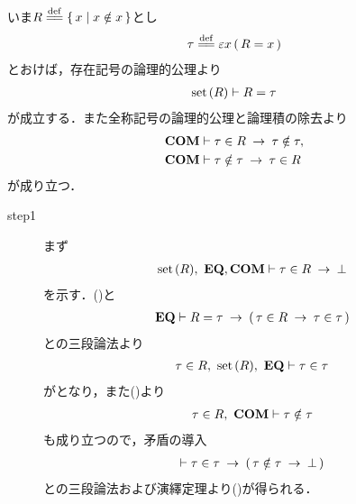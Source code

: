 	\begin{sketch}
		いま$R \defeq \Set{x}{x \notin x}$とし
		\begin{align}
			\tau \defeq \varepsilon x\, (\, R = x\, )
		\end{align}
		とおけば，存在記号の論理的公理より
		\begin{align}
			\operatorname*{set}\hspace{0.15em}(R) \vdash R = \tau
			\label{fom:Russell_paradox_1}
		\end{align}
		が成立する．また全称記号の論理的公理と論理積の除去より
		\begin{align}
			\mbox{\bf COM} &\vdash \tau \in R \hspace{0.25em}\rightarrow\hspace{0.25em} \tau \notin \tau, 
			\label{fom:Russell_paradox_2} \\
			\mbox{\bf COM} &\vdash \tau \notin \tau \hspace{0.25em}\rightarrow\hspace{0.25em} \tau \in R
			\label{fom:Russell_paradox_3}
		\end{align}
		が成り立つ．
		
		\begin{description}
			\item[step1]
				まず
				\begin{align}
					\operatorname*{set}\hspace{0.15em}(R),\ \mbox{{\bf EQ}},\mbox{\bf COM} \vdash \tau \in R \hspace{0.25em}\rightarrow\hspace{0.25em} \bot
					\label{fom:Russell_paradox_4}
				\end{align}
				を示す．()と
				\begin{align}
					\mbox{{\bf EQ}} \vdash R = \tau \hspace{0.25em}\rightarrow\hspace{0.25em} (\, \tau \in R \hspace{0.25em}\rightarrow\hspace{0.25em} \tau \in \tau\, )
				\end{align}
				との三段論法より
				\begin{align}
					\tau \in R,\ \operatorname*{set}\hspace{0.15em}(R),\ \mbox{{\bf EQ}} \vdash \tau \in \tau
				\end{align}
				がとなり，また()より
				\begin{align}
					\tau \in R,\ \mbox{\bf COM} \vdash \tau \notin \tau
				\end{align}
				も成り立つので，矛盾の導入
				\begin{align}
					\vdash \tau \in \tau \hspace{0.25em}\rightarrow\hspace{0.25em} (\, \tau \notin \tau \hspace{0.25em}\rightarrow\hspace{0.25em} \bot\, )
				\end{align}
				との三段論法および演繹定理より()が得られる．
				

\end{description}
\end{sketch}
